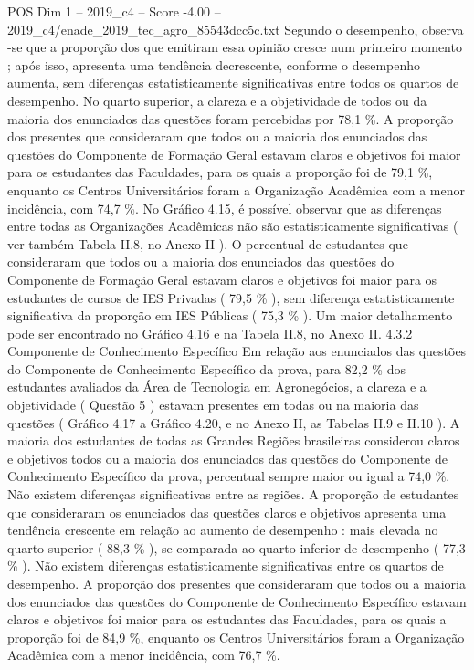 \begin{textsample}{POS Dim 1 – 2019\_c4 – Score -4.00 – 2019\_c4/enade\_2019\_tec\_agro\_85543dcc5c.txt}
Segundo o desempenho, observa -se que a proporção dos que emitiram essa opinião cresce num primeiro momento ; após isso, apresenta uma tendência decrescente, conforme o desempenho aumenta, sem diferenças estatisticamente significativas entre todos os quartos de desempenho.
No quarto superior, a clareza e a objetividade de todos ou da maioria dos enunciados das questões foram percebidas por 78,1 \%.
A proporção dos presentes que consideraram que todos ou a maioria dos enunciados das questões do Componente de Formação Geral estavam claros e objetivos foi maior para os estudantes das Faculdades, para os quais a proporção foi de 79,1 \%, enquanto os Centros Universitários foram a Organização Acadêmica com a menor incidência, com 74,7 \%.
No Gráfico 4.15, é possível observar que as diferenças entre todas as Organizações Acadêmicas não são estatisticamente significativas ( ver também Tabela II.8, no Anexo II ).
O percentual de estudantes que consideraram que todos ou a maioria dos enunciados das questões do Componente de Formação Geral estavam claros e objetivos foi maior para os estudantes de cursos de IES Privadas ( 79,5 \% ), sem diferença estatisticamente significativa da proporção em IES Públicas ( 75,3 \% ).
Um maior detalhamento pode ser encontrado no Gráfico 4.16 e na Tabela II.8, no Anexo II. 4.3.2 Componente de Conhecimento Específico Em relação aos enunciados das questões do Componente de Conhecimento Específico da prova, para 82,2 \% dos estudantes avaliados da Área de Tecnologia em Agronegócios, a clareza e a objetividade ( Questão 5 ) estavam presentes em todas ou na maioria das questões ( Gráfico 4.17 a Gráfico 4.20, e no Anexo II, as Tabelas II.9 e II.10 ).
A maioria dos estudantes de todas as Grandes Regiões brasileiras considerou claros e objetivos todos ou a maioria dos enunciados das questões do Componente de Conhecimento Específico da prova, percentual sempre maior ou igual a 74,0 \%.
Não existem diferenças significativas entre as regiões.
A proporção de estudantes que consideraram os enunciados das questões claros e objetivos apresenta uma tendência crescente em relação ao aumento de desempenho : mais elevada no quarto superior ( 88,3 \% ), se comparada ao quarto inferior de desempenho ( 77,3 \% ).
Não existem diferenças estatisticamente significativas entre os quartos de desempenho.
A proporção dos presentes que consideraram que todos ou a maioria dos enunciados das questões do Componente de Conhecimento Específico estavam claros e objetivos foi maior para os estudantes das Faculdades, para os quais a proporção foi de 84,9 \%, enquanto os Centros Universitários foram a Organização Acadêmica com a menor incidência, com 76,7 \%.

\end{textsample}
